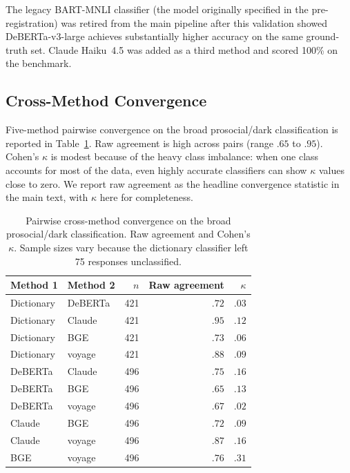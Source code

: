 The legacy BART-MNLI classifier (the model originally specified in the pre-registration) was retired from the main pipeline after this validation showed DeBERTa-v3-large achieves substantially higher accuracy on the same ground-truth set. Claude Haiku~4.5 was added as a third method and scored 100\% on the benchmark.

\subsection{Cross-Method Convergence}

Five-method pairwise convergence on the broad prosocial/dark classification is reported in Table~\ref{tab:supp_convergence}. Raw agreement is high across pairs (range $.65$ to $.95$). Cohen's $\kappa$ is modest because of the heavy class imbalance: when one class accounts for most of the data, even highly accurate classifiers can show $\kappa$ values close to zero. We report raw agreement as the headline convergence statistic in the main text, with $\kappa$ here for completeness.

\begin{table}[htbp]
  \centering
  \caption{Pairwise cross-method convergence on the broad prosocial/dark classification. Raw agreement and Cohen's $\kappa$. Sample sizes vary because the dictionary classifier left 75 responses unclassified.}
  \label{tab:supp_convergence}
  \small
  \begin{tabular}{ll r r r}
    \toprule
    Method 1 & Method 2 & $n$ & Raw agreement & $\kappa$ \\
    \midrule
    Dictionary & DeBERTa & 421 & $.72$ & $.03$ \\
    Dictionary & Claude  & 421 & $.95$ & $.12$ \\
    Dictionary & BGE     & 421 & $.73$ & $.06$ \\
    Dictionary & voyage  & 421 & $.88$ & $.09$ \\
    DeBERTa    & Claude  & 496 & $.75$ & $.16$ \\
    DeBERTa    & BGE     & 496 & $.65$ & $.13$ \\
    DeBERTa    & voyage  & 496 & $.67$ & $.02$ \\
    Claude     & BGE     & 496 & $.72$ & $.09$ \\
    Claude     & voyage  & 496 & $.87$ & $.16$ \\
    BGE        & voyage  & 496 & $.76$ & $.31$ \\
    \bottomrule
  \end{tabular}
\end{table}

